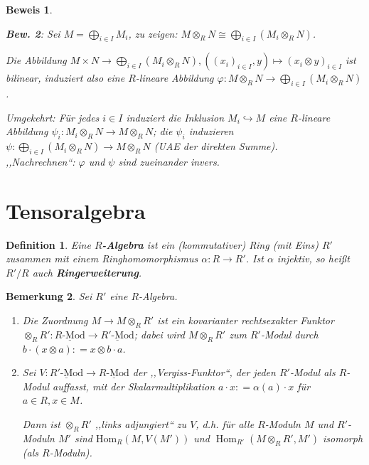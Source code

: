 \documentclass[a4paper,12pt]{scrbook}
\theoremstyle{break}
\newtheorem{Def}{Definition}[chapter]
\newtheorem{Bem}[Def]{Bemerkung}
\theoremstyle{nonumberbreak}
\newtheorem{Bew}{Beweis}
\theoremstyle{nonumberplain}
\newcommand{\emp}[1]{\textbf{\emph{#1}}}
\newcommand{\defeqr}[0]{\mathrel{\mathop:}=}
\DeclareMathOperator{\Hom}{Hom}
\begin{document}
\begin{Bew}
\begin{enumerate}
\textbf{Bew. 2}: Sei $M=\bigoplus_{i\in I} M_i$, zu zeigen: $M \otimes_R N \cong \bigoplus_{i\in I}(M_i\otimes_R N)$.

Die Abbildung $M\times N \to \bigoplus_{i\in I} (M_i\otimes_R N), \left((x_i)_{i \in I}, y\right)\mapsto (x_i\otimes y)_{i\in I}$ ist bilinear, induziert
also eine $R$-lineare Abbildung $\varphi: M\otimes_R N\to \bigoplus_{i\in I}(M_i\otimes_R N)$.

Umgekehrt: Für jedes $i\in I$ induziert die Inklusion $M_i \hookrightarrow M$ eine $R$-lineare
Abbildung $\psi_i : M_i \otimes_R N\to M\otimes_R N$;
die $\psi_i$ induzieren $\psi: \bigoplus_{i\in I}(M_i\otimes_R N)\to M\otimes_R N$ (UAE der direkten Summe). \\
,,Nachrechnen``: $\varphi$ und $\psi$ sind zueinander invers. 
\end{enumerate}
\end{Bew}
\section{Tensoralgebra}

\begin{Def}
\label{1.14}
Eine \emp{$R$-Algebra} ist ein (kommutativer) Ring (mit Eins) $R'$
zusammen mit einem Ringhomomorphismus $\alpha: R\to R'$.
Ist $\alpha$ injektiv, so hei\ss t $R'/R$ auch \emp{Ringerweiterung}.
\end{Def}

\begin{Bem}
\label{1.15}
Sei $R'$ eine $R$-Algebra.
\begin{enumerate}
\item Die Zuordnung $M\to M\otimes_R R'$ ist ein kovarianter rechtsexakter
  Funktor $\otimes_R R': \underline{\text{$R$-Mod}} \to
  \underline{\text{$R'$-Mod}}$; dabei wird $M \otimes_R R'$ zum $R'$-Modul
  durch $b\cdot (x\otimes a)\defeqr x\otimes b\cdot a$.

\item Sei $V: \underline{\text{$R'$-Mod}} \to \underline{\text{$R$-Mod}}$ der
  ,,Vergiss-Funktor``, der jeden $R'$-Modul als $R$-Modul auffasst, mit der
  Skalarmultiplikation $a\cdot x\defeqr\alpha(a)\cdot x$ für $a\in R, x\in
  M$.

  Dann ist $\otimes_R R'$ ,,links adjungiert`` zu $V$, d.h. für alle $R$-Moduln
  $M$ und $R'$-Moduln $M'$ sind $\textrm{Hom}_R(M, V(M'))$ und
  $\Hom_{R'}(M\otimes_R R', M')$ isomorph (als $R$-Moduln).
\end{enumerate}
\end{Bem}
\end{document}
